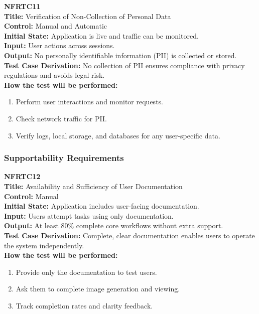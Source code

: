 \documentclass[12pt, titlepage]{article}
\begin{document}
\vspace{1em}

\textbf{NFRTC11}\\
\textbf{Title:} Verification of Non-Collection of Personal Data\\
\textbf{Control:} Manual and Automatic\\
\textbf{Initial State:} Application is live and traffic can be monitored.\\
\textbf{Input:} User actions across sessions.\\
\textbf{Output:} No personally identifiable information (PII) is collected or stored.\\
\textbf{Test Case Derivation:} No collection of PII ensures compliance with privacy regulations and avoids legal risk.\\
\textbf{How the test will be performed:}
\begin{enumerate}
  \item Perform user interactions and monitor requests.
  \item Check network traffic for PII.
  \item Verify logs, local storage, and databases for any user-specific data.
\end{enumerate}

\vspace{1em}
\subsubsection{Supportability Requirements}

\textbf{NFRTC12}\\
\textbf{Title:} Availability and Sufficiency of User Documentation\\
\textbf{Control:} Manual\\
\textbf{Initial State:} Application includes user-facing documentation.\\
\textbf{Input:} Users attempt tasks using only documentation.\\
\textbf{Output:} At least 80\% complete core workflows without extra support.\\
\textbf{Test Case Derivation:} Complete, clear documentation enables users to operate the system independently.\\
\textbf{How the test will be performed:}
\begin{enumerate}
  \item Provide only the documentation to test users.
  \item Ask them to complete image generation and viewing.
  \item Track completion rates and clarity feedback.
\end{enumerate}
\end{document}
